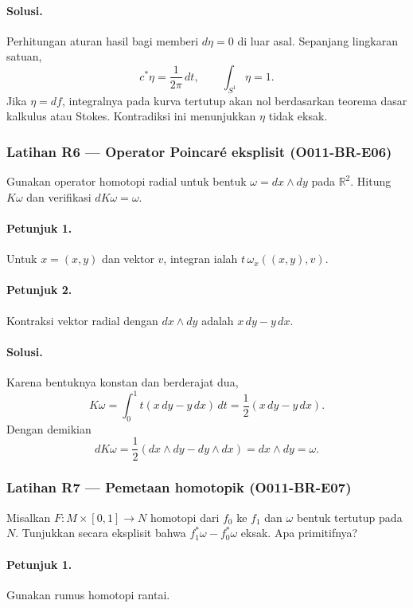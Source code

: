 \paragraph{Solusi.}
Perhitungan aturan hasil bagi memberi $d\eta=0$ di luar asal. Sepanjang
lingkaran satuan,
\[
 c^*\eta=\frac{1}{2\pi}\,dt,
 \qquad \int_{S^1}\eta=1.
\]
Jika $\eta=df$, integralnya pada kurva tertutup akan nol berdasarkan teorema
dasar kalkulus atau Stokes. Kontradiksi ini menunjukkan $\eta$ tidak eksak.

\subsubsection*{Latihan R6 — Operator Poincar\'e eksplisit (O011-BR-E06)}
\label{o011-br-e06}

Gunakan operator homotopi radial untuk bentuk
$\omega=dx\wedge dy$ pada $\mathbb R^2$. Hitung $K\omega$ dan verifikasi
$dK\omega=\omega$.

\paragraph{Petunjuk 1.}
Untuk $x=(x,y)$ dan vektor $v$, integran ialah
$t\,\omega_x((x,y),v)$.

\paragraph{Petunjuk 2.}
Kontraksi vektor radial dengan $dx\wedge dy$ adalah $x\,dy-y\,dx$.

\paragraph{Solusi.}
Karena bentuknya konstan dan berderajat dua,
\[
 K\omega=\int_0^1t(x\,dy-y\,dx)\,dt
 =\frac12(x\,dy-y\,dx).
\]
Dengan demikian
\[
 dK\omega=\frac12(dx\wedge dy-dy\wedge dx)=dx\wedge dy=\omega.
\]

\subsubsection*{Latihan R7 — Pemetaan homotopik (O011-BR-E07)}
\label{o011-br-e07}

Misalkan $F\colon M\times[0,1]\to N$ homotopi dari $f_0$ ke $f_1$ dan
$\omega$ bentuk tertutup pada $N$. Tunjukkan secara eksplisit bahwa
$f_1^*\omega-f_0^*\omega$ eksak. Apa primitifnya?

\paragraph{Petunjuk 1.}
Gunakan rumus homotopi rantai.

